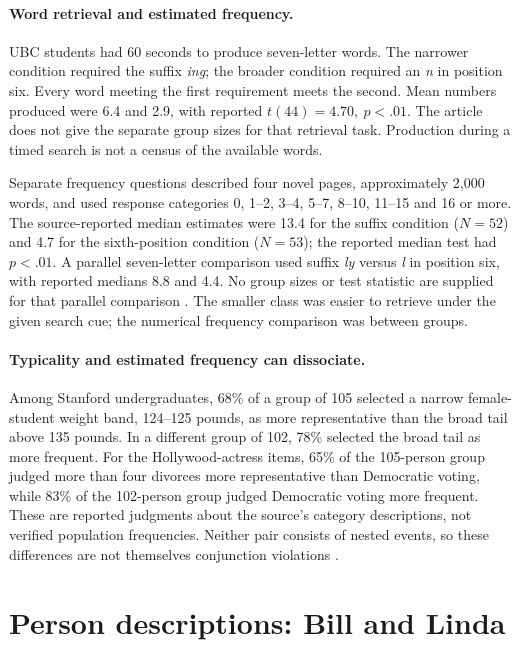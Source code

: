 \paragraph{Word retrieval and estimated frequency.}
UBC students had 60 seconds to produce seven-letter words.
The narrower condition required the suffix \emph{ing}; the broader
condition required an \emph{n} in position six. Every word meeting
the first requirement meets the second. Mean numbers produced were
6.4 and 2.9, with reported \(t(44)=4.70,\ p<.01\).
The article does not give the separate group sizes for that retrieval task.
Production during a timed search is not a census of the available words.

Separate frequency questions described four novel pages, approximately
2,000 words, and used response categories
0, 1--2, 3--4, 5--7, 8--10, 11--15 and 16 or more.
The source-reported median estimates were 13.4 for the suffix condition
(\(N=52\)) and 4.7 for the sixth-position condition (\(N=53\));
the reported median test had \(p<.01\).
A parallel seven-letter comparison used suffix \emph{ly} versus
\emph{l} in position six, with reported medians 8.8 and 4.4.
No group sizes or test statistic are supplied for that parallel comparison
\cite[p.~295]{TverskyKahneman1983Conjunction}.
The smaller class was easier to retrieve under the given search cue;
the numerical frequency comparison was between groups.

\paragraph{Typicality and estimated frequency can dissociate.}
Among Stanford undergraduates, 68\% of a group of 105 selected a
narrow female-student weight band, 124--125 pounds, as more representative
than the broad tail above 135 pounds. In a different group of 102,
78\% selected the broad tail as more frequent.
For the Hollywood-actress items, 65\% of the 105-person group judged
more than four divorces more representative than Democratic voting,
while 83\% of the 102-person group judged Democratic voting more frequent.
These are reported judgments about the source's category descriptions,
not verified population frequencies. Neither pair consists of nested
events, so these differences are not themselves conjunction violations
\cite[p.~296]{TverskyKahneman1983Conjunction}.

\section{Person descriptions: Bill and Linda}
\label{sec:p19-conjunction-persons}

